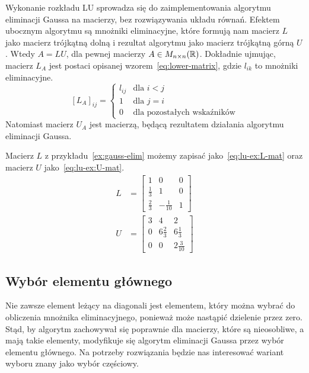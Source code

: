 \documentclass[../main.tex]{subfiles}
\begin{document}
    Wykonanie rozkładu LU sprowadza się do zaimplementowania algorytmu eliminacji Gaussa
    na macierzy, bez rozwiązywania układu równań. Efektem ubocznym algorytmu są mnożniki
    eliminacyjne, które formują nam macierz \( L \) jako macierz trójkątną dolną
    i rezultat algorytmu jako macierz trójkątną górną \( U \). Wtedy \( A = LU \),
    dla pewnej macierzy \( A \in M_{n \times n}(\mathbb{R}) \). Dokładnie ujmując, macierz
    \( L_A \) jest postaci opisanej wzorem~\ref{eq:lower-matrix}, gdzie \( l_{ik} \)
    to mnożniki eliminacyjne.
    \begin{equation} \label{eq:lower-matrix}
      [L_A]_{ij} = \begin{cases}
        l_{ij} & \text{dla $i < j$} \\
        1 & \text{dla $j = i$} \\
        0 & \text{dla pozostałych wskaźników}
      \end{cases}
    \end{equation}
    Natomiast macierz \( U_A \) jest macierzą, będącą rezultatem działania algorytmu
    eliminacji Gaussa.

    \begin{example}
      Macierz \( L \) z przykładu~\ref{ex:gauss-elim} możemy zapisać jako~\ref{eq:lu-ex:L-mat}
      oraz macierz \( U \) jako~\ref{eq:lu-ex:U-mat}.
      \begin{align} \label{eq:lu-ex:L-mat}
        L &= \begin{bmatrix}
          1 & 0 & 0 \\
          \frac{1}{3} & 1 & 0 \\
          \frac{2}{3} & -\frac{1}{10} & 1 
        \end{bmatrix} \\
        U &= \begin{bmatrix} \label{eq:lu-ex:U-mat}
          3 & 4 & 2 \\
          0 & 6\frac{2}{3} & 6\frac{1}{3} \\
          0 & 0 & 2\frac{3}{10}
        \end{bmatrix}
      \end{align}
    \end{example}

    \subsection{Wybór elementu głównego}
    Nie zawsze element leżący na diagonali jest elementem, który można wybrać do obliczenia
    mnożnika eliminacyjnego, ponieważ może nastąpić dzielenie przez zero. Stąd, by algorytm
    zachowywał się poprawnie dla macierzy, które są nieosobliwe, a mają takie elementy, 
    modyfikuje się algorytm eliminacji Gaussa przez wybór elementu głównego. Na potrzeby
    rozwiązania będzie nas interesować wariant wyboru znany jako wybór częściowy.
\end{document}
